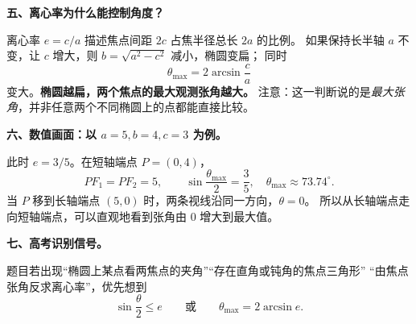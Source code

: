 \begin{explanationbox}
\medskip
\textbf{五、离心率为什么能控制角度？}

离心率 $e=c/a$ 描述焦点间距 $2c$ 占焦半径总长 $2a$ 的比例。
如果保持长半轴 $a$ 不变，让 $c$ 增大，则 $b=\sqrt{a^2-c^2}$ 减小，椭圆变扁；
同时
\[
\theta_{\max}=2\arcsin\frac ca
\]
变大。\textbf{椭圆越扁，两个焦点的最大观测张角越大。}
注意：这一判断说的是\emph{最大张角}，并非任意两个不同椭圆上的点都能直接比较。

\medskip
\textbf{六、数值画面：以 $a=5,b=4,c=3$ 为例。}

此时 $e=3/5$。在短轴端点 $P=(0,4)$，
\[
PF_1=PF_2=5,\qquad
\sin\frac{\theta_{\max}}2=\frac35,
\quad\theta_{\max}\approx73.74^\circ.
\]
当 $P$ 移到长轴端点 $(5,0)$ 时，两条视线沿同一方向，$\theta=0$。
所以从长轴端点走向短轴端点，可以直观地看到张角由 $0$ 增大到最大值。

\medskip
\textbf{七、高考识别信号。}

题目若出现“椭圆上某点看两焦点的夹角”“存在直角或钝角的焦点三角形”
“由焦点张角反求离心率”，优先想到
\[
\boxed{\sin\frac\theta2\le e}
\qquad\text{或}\qquad
\boxed{\theta_{\max}=2\arcsin e}.
\]
\end{explanationbox}
